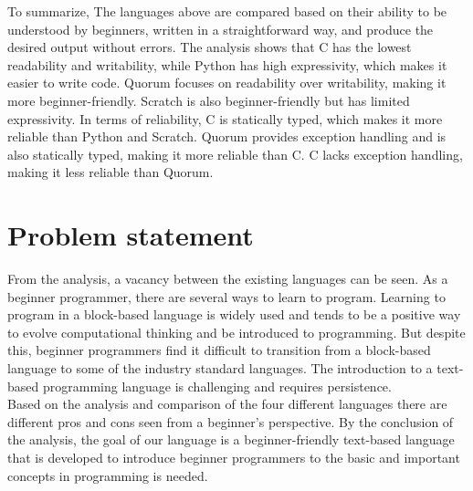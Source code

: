 To summarize, The languages above are compared based on their ability to be understood by beginners, written in a straightforward way, and produce the desired output without errors. The analysis shows that C has the lowest readability and writability, while Python has high expressivity, which makes it easier to write code. Quorum focuses on readability over writability, making it more beginner-friendly. Scratch is also beginner-friendly but has limited expressivity. In terms of reliability, C is statically typed, which makes it more reliable than Python and Scratch. Quorum provides exception handling and is also statically typed, making it more reliable than C. C lacks exception handling, making it less reliable than Quorum.

\section{Problem statement} \label{problemstatement}


From the analysis, a vacancy between the existing languages can be seen. As a beginner programmer, there are several ways to learn to program. Learning to program in a block-based language is widely used and tends to be a positive way to evolve computational thinking and be introduced to programming. But despite this, beginner programmers find it difficult to transition from a block-based language to some of the industry standard languages. The introduction to a text-based programming language is challenging and requires persistence. \\
Based on the analysis and comparison of the four different languages there are different pros and cons seen from a beginner's perspective. By the conclusion of the analysis, the goal of our language is a beginner-friendly text-based language that is developed to introduce beginner programmers to the basic and important concepts in programming is needed. \\

